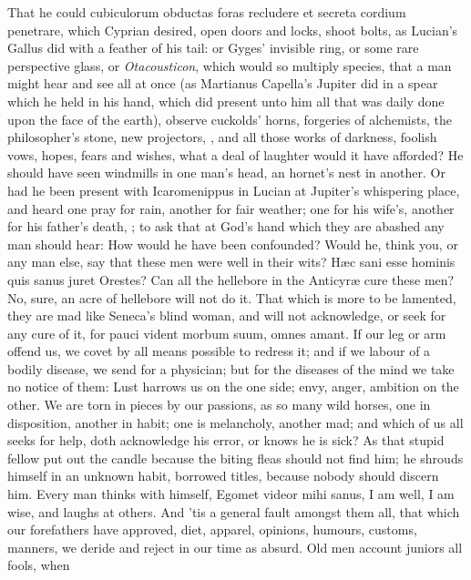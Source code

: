 {That he could cubiculorum obductas foras recludere et secreta cordium
penetrare, which Cyprian desired, open doors and locks, shoot
bolts, as Lucian's Gallus did with a feather of his tail: or Gyges'
invisible ring, or some rare perspective glass, or \emph{Otacousticon},
which would so multiply species, that a man might hear and see all at
once (as  Martianus Capella's Jupiter did in a spear which he held
in his hand, which did present unto him all that was daily done upon
the face of the earth), observe cuckolds' horns, forgeries of
alchemists, the philosopher's stone, new projectors, \etc{}, and all those
works of darkness, foolish vows, hopes, fears and wishes, what a deal
of laughter would it have afforded? He should have seen windmills in
one man's head, an hornet's nest in another. Or had he been present
with Icaromenippus in Lucian at Jupiter's whispering place, and
heard one pray for rain, another for fair weather; one for his wife's,
another for his father's death, \etc{}; to ask that at God's hand which
they are abashed any man should hear: How would he have been
confounded? Would he, think you, or any man else, say that these men
were well in their wits? H\ae{}c sani esse hominis quis sanus juret
Orestes? Can all the hellebore in the Anticyr\ae{} cure these men? No,
sure, an acre of hellebore will not do it.
That which is more to be lamented, they are mad like Seneca's blind
woman, and will not acknowledge, or seek for any cure of it, for
pauci vident morbum suum, omnes amant. If our leg or arm offend us, we
covet by all means possible to redress it; and if we labour of a
bodily disease, we send for a physician; but for the diseases of the
mind we take no notice of them: Lust harrows us on the one side;
envy, anger, ambition on the other. We are torn in pieces by our
passions, as so many wild horses, one in disposition, another in habit;
one is melancholy, another mad; and which of us all seeks for
help, doth acknowledge his error, or knows he is sick? As that stupid
fellow put out the candle because the biting fleas should not find him;
he shrouds himself in an unknown habit, borrowed titles, because nobody
should discern him. Every man thinks with himself, Egomet videor mihi
sanus, I am well, I am wise, and laughs at others. And 'tis a general
fault amongst them all, that  which our forefathers have approved,
diet, apparel, opinions, humours, customs, manners, we deride and
reject in our time as absurd. Old men account juniors all fools, when
}
